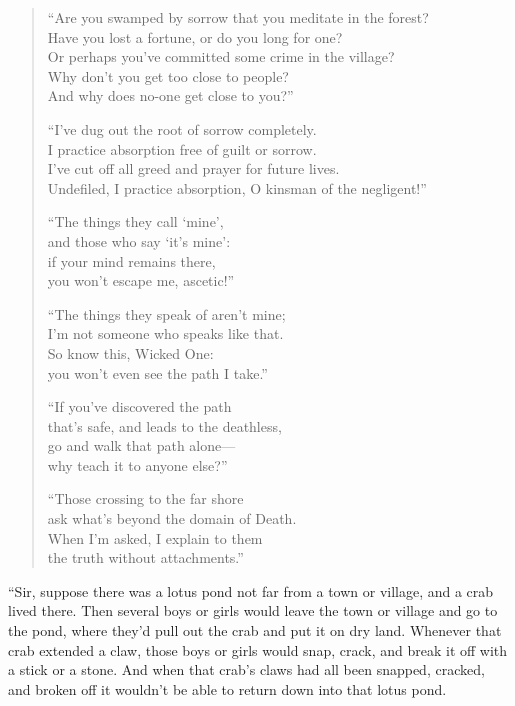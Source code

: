 \documentclass[12pt,openany]{book}%
\begin{document}
\begin{verse}%
“Are you swamped by sorrow that you meditate in the forest? \\
Have you lost a fortune, or do you long for one? \\
Or perhaps you’ve committed some crime in the village? \\
Why don’t you get too close to people? \\
And why does no-one get close to you?” 

“I’ve dug out the root of sorrow completely. \\
I practice absorption free of guilt or sorrow. \\
I’ve cut off all greed and prayer for future lives. \\
Undefiled, I practice absorption, O kinsman of the negligent!” 

“The things they call ‘mine’, \\
and those who say ‘it’s mine’: \\
if your mind remains there, \\
you won’t escape me, ascetic!” 

“The things they speak of aren’t mine; \\
I’m not someone who speaks like that. \\
So know this, Wicked One: \\
you won’t even see the path I take.” 

“If you’ve discovered the path \\
that’s safe, and leads to the deathless, \\
go and walk that path alone—\\
why teach it to anyone else?” 

“Those crossing to the far shore \\
ask what’s beyond the domain of Death. \\
When I’m asked, I explain to them \\
the truth without attachments.” 

%
\end{verse}

“Sir, suppose there was a lotus pond not far from a town or village, and a crab lived there. Then several boys or girls would leave the town or village and go to the pond, where they’d pull out the crab and put it on dry land. Whenever that crab extended a claw, those boys or girls would snap, crack, and break it off with a stick or a stone. And when that crab’s claws had all been snapped, cracked, and broken off it wouldn’t be able to return down into that lotus pond. 
\end{document}

